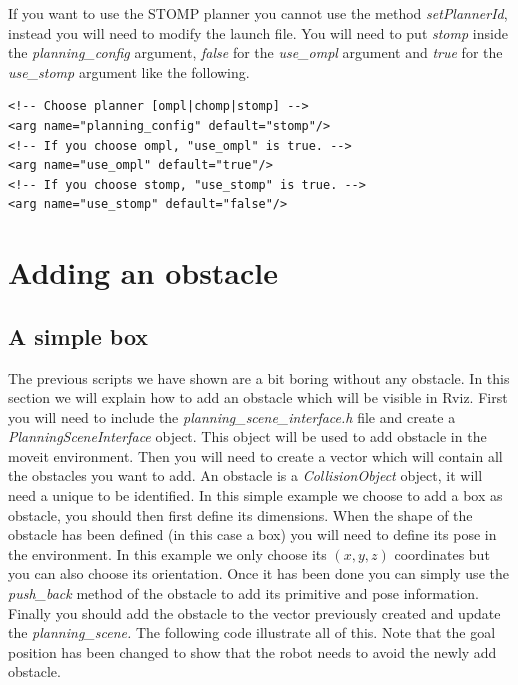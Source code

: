 If you want to use the STOMP planner you cannot use the method \emph{setPlannerId}, instead you will need to modify the launch file. You will need to put \emph{stomp} inside the \emph{planning\_config} argument, \emph{false} for the \emph{use\_ompl} argument and \emph{true} for the \emph{use\_stomp} argument like the following. 



\begin{lstlisting}
<!-- Choose planner [ompl|chomp|stomp] -->
<arg name="planning_config" default="stomp"/>
<!-- If you choose ompl, "use_ompl" is true. -->
<arg name="use_ompl" default="true"/>
<!-- If you choose stomp, "use_stomp" is true. -->
<arg name="use_stomp" default="false"/>
\end{lstlisting}


\section{Adding an obstacle}
\subsection{A simple box}

The previous scripts we have shown are a bit boring without any obstacle. In this section we will explain how to add an obstacle which will be visible in Rviz. First you will need to include the \emph{planning\_scene\_interface.h} file and create a \emph{PlanningSceneInterface} object. This object will be used to add obstacle in the moveit environment. Then you will need to create a vector which will contain all the obstacles you want to add. An obstacle is a \emph{CollisionObject} object, it will need a unique to be identified. In this simple example we choose to add a box as obstacle, you should then first define its dimensions. When the shape of the obstacle has been defined (in this case a box) you will need to define its pose in the environment. In this example we only choose its $(x,y,z)$ coordinates but you can also choose its orientation. Once it has been done you can simply use the \emph{push\_back} method of the obstacle to add its primitive and pose information. Finally you should add the obstacle to the vector previously created and update the \emph{planning\_scene.
}
The following code illustrate all of this. Note that the goal position has been changed to show that the robot needs to avoid the newly add obstacle.






